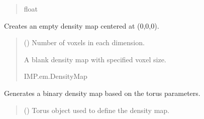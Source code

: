 \documentclass[letterpaper,10pt,english]{sphinxmanual}
\begin{document}
\begin{fulllineitems}
\begin{fulllineitems}
\begin{quote}
\begin{description}
\sphinxAtStartPar
float

\end{description}\end{quote}

\end{fulllineitems}


\begin{fulllineitems}
\label{\detokenize{src:src.BagelFitter.BagelFitter.create_blank_density_map}}
\pysigstartsignatures
{}
\pysigstopsignatures
\sphinxAtStartPar
Creates an empty density map centered at (0,0,0).
\begin{quote}\begin{description}
\sphinxAtStartPar
{} () \textendash{} Number of voxels in each dimension.

\sphinxAtStartPar
A blank density map with specified voxel size.

\sphinxAtStartPar
IMP.em.DensityMap

\end{description}\end{quote}

\end{fulllineitems}


\begin{fulllineitems}
\label{\detokenize{src:src.BagelFitter.BagelFitter.fill_binary_density}}
\pysigstartsignatures
{}
\pysigstopsignatures
\sphinxAtStartPar
Generates a binary density map based on the torus parameters.
\begin{quote}\begin{description}
\sphinxAtStartPar
{} ({\hyperref[\detokenize{src:src.Torus.Torus}]{}}) \textendash{} Torus object used to define the density map.


\end{description}
\end{quote}
\end{fulllineitems}
\end{fulllineitems}
\end{document}
